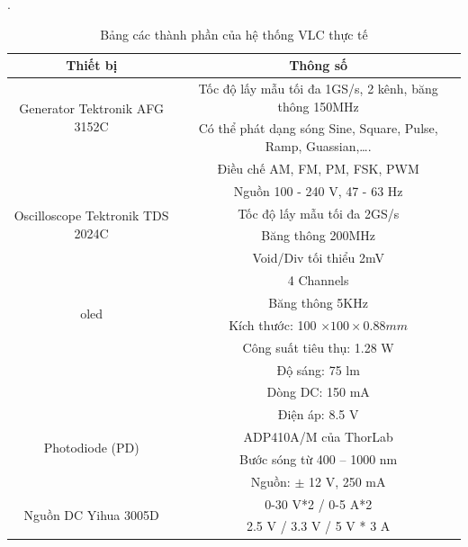\begin{table}[ht]
	\caption{Bảng các thành phần của hệ thống VLC thực tế}.
	\begin{center}
	\small
		\begin{tabular}{|c|c|}
			\hline
			Thiết bị & Thông số\\
			\hline
			\multirow{2}{*}{Generator Tektronik AFG 3152C}
    			&Tốc độ lấy mẫu tối đa 1GS/s, 2 kênh, băng thông 150MHz\\
			&Có thể phát dạng sóng Sine, Square, Pulse, Ramp, Guassian,…. \\			
			&Điều chế AM, FM, PM, FSK, PWM \\
			&Nguồn 100 - 240 V, 47 - 63 Hz\\
			\hline
			\multirow{2}{*}{Oscilloscope Tektronik TDS 2024C}
			&Tốc độ lấy mẫu tối đa 2GS/s\\
			&Băng thông 200MHz\\ 
			&Void/Div tối thiểu 2mV\\
			&4 Channels \\
			\hline
			\multirow{2}{*}{\ac{oled}} \cite{lgN6SA30C} 
			& Băng thông 5KHz\\
			& Kích thước: 100 $\times 100 \times 0.88 mm$\\
			& Công suất tiêu thụ: 1.28 W\\
			& Độ sáng: 75 lm\\
			& Dòng DC: 150 mA\\
			& Điện áp: 8.5 V\\
			\hline
			\multirow{2}{*}{Photodiode (PD)} \cite{APD410A}
			& ADP410A/M của ThorLab \\
			& Bước sóng từ 400 – 1000 nm \\
			& Nguồn: $\pm$ 12 V, 250 mA \\
			\hline
			\multirow{2}{*}{Nguồn DC Yihua 3005D}
			& 0-30 V*2 / 0-5 A*2 \\
			& 2.5 V / 3.3 V / 5 V * 3 A \\
			\hline
		\end{tabular}
		\label{tab:VLC_thucte}
	\end{center}
\end{table}
